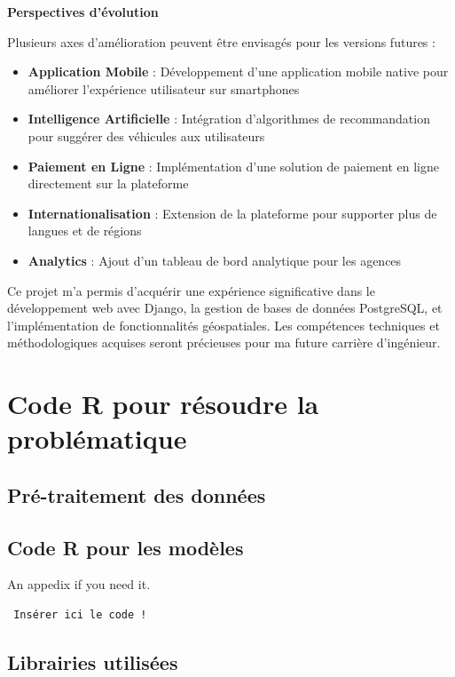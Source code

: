 \documentclass[a4paper, oneside, 12pt, final]{extreport}
\begin{document}
\textbf{Perspectives d'évolution}

Plusieurs axes d'amélioration peuvent être envisagés pour les versions futures :

\begin{itemize}
    \item \textbf{Application Mobile} : Développement d'une application mobile native pour améliorer l'expérience utilisateur sur smartphones
    \item \textbf{Intelligence Artificielle} : Intégration d'algorithmes de recommandation pour suggérer des véhicules aux utilisateurs
    \item \textbf{Paiement en Ligne} : Implémentation d'une solution de paiement en ligne directement sur la plateforme
    \item \textbf{Internationalisation} : Extension de la plateforme pour supporter plus de langues et de régions
    \item \textbf{Analytics} : Ajout d'un tableau de bord analytique pour les agences
\end{itemize}

Ce projet m'a permis d'acquérir une expérience significative dans le développement web avec Django, la gestion de bases de données PostgreSQL, et l'implémentation de fonctionnalités géospatiales. Les compétences techniques et méthodologiques acquises seront précieuses pour ma future carrière d'ingénieur.

\newpage
\appendix
{}

\chapter{Code R pour résoudre la problématique}
\label{chap:appendix}


\section{Pré-traitement des données}
\section{Code R pour les modèles}

 An appedix if you need it.
 
 \begin{verbatim}
 Insérer ici le code !
 \end{verbatim}

\section{Librairies utilisées}
 
\end{document}

